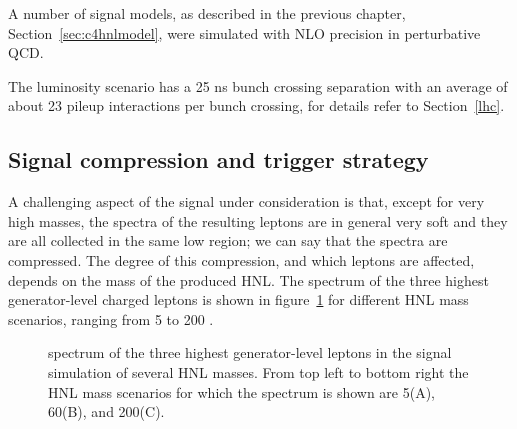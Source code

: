 A number of signal models, as described in the previous
chapter, Section~\ref{sec:c4hnlmodel}, were simulated with NLO precision in
perturbative QCD. 

The luminosity scenario has a 25 ns bunch crossing separation with an
average of about 23 pileup interactions per bunch
crossing, for details refer to Section~\ref{lhc}.

\subsection{Signal compression and trigger strategy}\label{sec:compression}
A challenging aspect of the signal under consideration is that, except
for very high masses, the \pt
spectra of the resulting leptons are in general very soft and they are
all collected in the same low \pt region; we can say that the \pt
spectra are compressed. The degree of this compression, and which
leptons are affected, depends on the mass of the produced HNL. The \pt
spectrum of the three highest \pt generator-level charged leptons is shown in figure~\ref{fig:genPt} for different HNL mass scenarios, ranging from 5 to 200 \GeV . 

\begin{figure}[h]
\noindent
{}
\caption{\pt spectrum of the three highest generator-level leptons in
  the signal simulation of several HNL masses. From top left to bottom
  right the HNL mass scenarios for which the spectrum is shown are
  5\GeV (A), 60\GeV (B), and 200\GeV (C). \willem}
\label{fig:genPt}
\end{figure}

